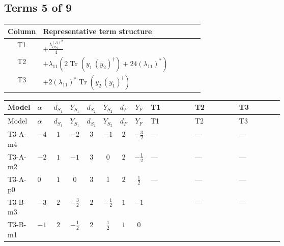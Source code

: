 \documentclass[8pt]{article}
\begin{document}
\begin{landscape}
\subsection*{Terms 5 of 9}
\begin{center}
\begin{tabular}{@{}c >{\raggedright\arraybackslash}p{0.82\linewidth}@{}}
\toprule
Column & Representative term structure \\
\midrule
T1 & \(\displaystyle +\frac{{\lambda_{HS_1}^{(A)}}^2}{4}\) \\
\midrule
T2 & \(\displaystyle +{\lambda_{11}} (2 \operatorname{Tr}\!\left({y_1}\,\left({y_2}\right)^{\dagger}\right)+24 \left({\lambda_{11}}\right)^{*})\) \\
\midrule
T3 & \(\displaystyle +2 \left({\lambda_{11}}\right)^{*} \operatorname{Tr}\!\left({y_2}\,\left({y_1}\right)^{\dagger}\right)\) \\
\midrule
\bottomrule
\end{tabular}
\end{center}
\smallskip
\tiny
\begin{longtable}{@{}llcccccc >{\raggedright\arraybackslash}p{0.21\linewidth} >{\raggedright\arraybackslash}p{0.21\linewidth} >{\raggedright\arraybackslash}p{0.21\linewidth}@{}}
\toprule
Model & $\alpha$ & $d_{S_1}$ & $Y_{S_1}$ & $d_{S_2}$ & $Y_{S_2}$ & $d_F$ & $Y_F$ & T1 & T2 & T3 \\
\midrule
\endfirsthead
\toprule
Model & $\alpha$ & $d_{S_1}$ & $Y_{S_1}$ & $d_{S_2}$ & $Y_{S_2}$ & $d_F$ & $Y_F$ & T1 & T2 & T3 \\
\midrule
\endhead
T3-A-m4 & $-4$ & $1$ & $-2$ & $3$ & $-1$ & $2$ & $-\frac{3}{2}$ & --- & --- & --- \\
\midrule
T3-A-m2 & $-2$ & $1$ & $-1$ & $3$ & $0$ & $2$ & $-\frac{1}{2}$ & --- & --- & --- \\
\midrule
T3-A-p0 & $0$ & $1$ & $0$ & $3$ & $1$ & $2$ & $\frac{1}{2}$ & --- & --- & --- \\
\midrule
T3-B-m3 & $-3$ & $2$ & $-\frac{3}{2}$ & $2$ & $-\frac{1}{2}$ & $1$ & $-1$ & \scriptsize\adjustbox{max width=\linewidth}{$\begin{gathered} +\frac{{\lambda_{HS_1}^{(A)}}^2}{4}\end{gathered}$} & --- & --- \\
\midrule
T3-B-m1 & $-1$ & $2$ & $-\frac{1}{2}$ & $2$ & $\frac{1}{2}$ & $1$ & $0$ & \scriptsize\adjustbox{max width=\linewidth}{$\begin{gathered} +\frac{{\lambda_{HS_1}^{(A)}}^2}{4}\end{gathered}$} & \scriptsize\adjustbox{max width=\linewidth}{$\begin{gathered} +{\lambda_{11}} (2 \operatorname{Tr}\!\left({y_1}\,\left({y_2}\right)^{\dagger}\right)+24 \left({\lambda_{11}}\right)^{*})\end{gathered}$} & \scriptsize\adjustbox{max width=\linewidth}{$\begin{gathered} +2 \left({\lambda_{11}}\right)^{*} \operatorname{Tr}\!\left({y_2}\,\left({y_1}\right)^{\dagger}\right)\end{gathered}$} \\

\end{longtable}
\end{landscape}
\end{document}

